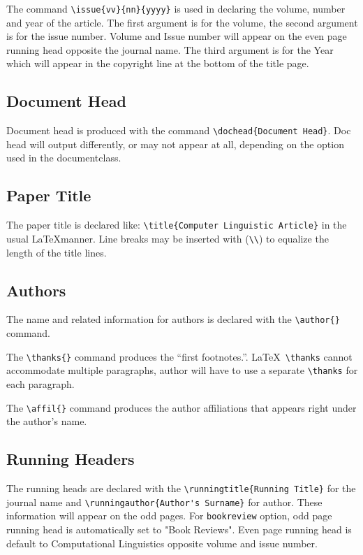 \documentclass{clv3}
\begin{document}
The command \verb|\issue{vv}{nn}{yyyy}| is used in declaring the volume, number
and year of the article. The first argument is for the volume, the second argument
is for the issue number. Volume and Issue number will appear on the even page
running head opposite the journal name. The third argument is for the Year which
will appear in the copyright line at the bottom of the title page.

\subsection{Document Head}

Document head is produced with the command \verb|\dochead{Document Head}|. Doc head
will output differently, or may not appear at all, depending on the option used in the
documentclass.

\subsection{Paper Title}

The paper title is declared like: \verb|\title{Computer Linguistic Article}|
in the usual \LaTeX manner. Line breaks may be inserted with (\verb|\\|) to equalize
the length of the title lines.

\subsection{Authors}
The name and related information for authors is declared with the \verb|\author{}| command.

The \verb|\thanks{}| command produces the ``first footnotes.''. \LaTeX\ \verb|\thanks|
cannot accommodate multiple paragraphs, author will have to use a separate \verb|\thanks|
for each paragraph.

The \verb|\affil{}| command produces the author affiliations that appears right under
the author's name.

\subsection{Running Headers}
The running heads are declared with the \verb|\runningtitle{Running Title}| for the
journal name and \verb|\runningauthor{Author's Surname}| for author. These information
will appear on the odd pages. For {\tt bookreview} option, odd page running head is
automatically set to "Book Reviews". Even page running head is default to Computational
Linguistics opposite volume and issue number.
\end{document}
